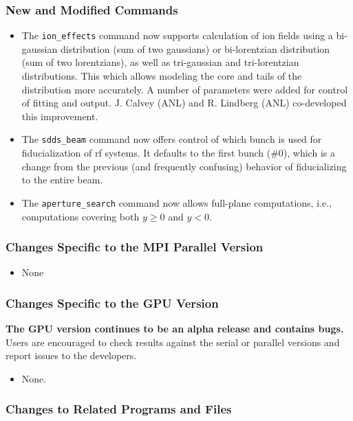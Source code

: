 \documentclass[11pt]{article}
\begin{document}
\subsubsection{New and Modified Commands}
\begin{itemize}
\item The \verb|ion_effects| command now supports calculation of ion fields using a bi-gaussian distribution (sum of two
  gaussians) or bi-lorentzian distribution (sum of two lorentzians), as well as tri-gaussian and tri-lorentzian
  distributions. This which allows modeling the core and tails of the distribution more accurately. A number of parameters
  were added for control of fitting and output. J. Calvey (ANL) and R. Lindberg (ANL) co-developed this improvement.
\item The \verb|sdds_beam| command now offers control of which bunch is used for fiducialization of rf systems.
  It defaults to the first bunch (\#0), which is a change from the previous (and frequently confusing) behavior
  of fiducializing to the entire beam.
\item The \verb|aperture_search| command now allows full-plane computations, i.e., computations covering both $y\geq 0$ and
  $y<0$.
\end{itemize}

\subsubsection{Changes Specific to the MPI Parallel Version}

\begin{itemize}
\item None
\end{itemize}

\subsubsection{Changes Specific to the GPU Version}

{\bf The GPU version continues to be an alpha release and contains bugs.}
Users are encouraged to check results against the serial or parallel versions and report issues to the developers.

\begin{itemize}
\item None.
\end{itemize}

\subsubsection{Changes to Related Programs and Files}
\end{document}
